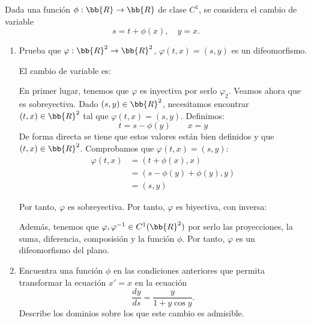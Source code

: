 \documentclass[12pt]{article}
\begin{document}
    \begin{ejercicio}
        Dada una función $\phi : \bb{R} \to \bb{R}$ de clase $C^1$, se considera el cambio de variable
        \begin{equation*}
            s = t + \phi(x), \quad y = x.
        \end{equation*}
        \begin{enumerate}
            \item Prueba que $\varphi : \bb{R}^2 \to \bb{R}^2$, $\varphi(t, x) = (s, y)$ es un difeomorfismo.
            
            El cambio de variable es:

            En primer lugar, tenemos que $\varphi$ es inyectiva por serlo $\varphi_2$. Veamos ahora que es sobreyectiva. Dado $(s,y)\in\bb{R}^2$, necesitamos encontrar $(t,x)\in\bb{R}^2$ tal que $\varphi(t,x)=(s,y)$. Definimos:
            \begin{equation*}
                t=s-\phi(y)\qquad x=y
            \end{equation*}
            De forma directa se tiene que estos valores están bien definidos y que $(t,x)\in\bb{R}^2$. Comprobamos que $\varphi(t,x)=(s,y)$:
            \begin{align*}
                \varphi(t,x)
                &=(t+\phi(x),x)\\
                &=(s-\phi(y)+\phi(y),y)\\
                &=(s,y)
            \end{align*}

            Por tanto, $\varphi$ es sobreyectiva. Por tanto, $\varphi$ es biyectiva, con inversa:

            Además, tenemos que $\varphi,\varphi^{-1}\in C^1(\bb{R}^2)$ por serlo las proyecciones, la suma, diferencia, composisión y la función $\phi$. Por tanto, $\varphi$ es un difeomorfismo del plano.

            \item Encuentra una función $\phi$ en las condiciones anteriores que permita transformar la ecuación $x' = x$ en la ecuación
            \begin{equation*}
                \dfrac{dy}{ds} = \dfrac{y}{1 + y \cos y}.
            \end{equation*}
            Describe los dominios sobre los que este cambio es admisible.\\


\end{enumerate}
\end{ejercicio}
\end{document}
